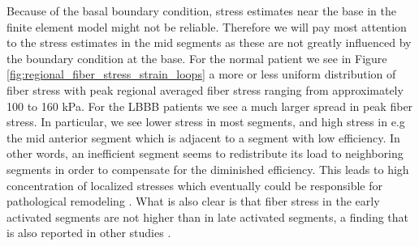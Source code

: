 Because of the basal boundary condition, stress estimates near the
base in the finite element model might not be reliable. Therefore we
will pay most attention to the stress 
estimates in the mid segments as these are not greatly influenced by
the boundary condition at the base. For the normal patient we see in
Figure \ref{fig:regional_fiber_stress_strain_loops} a
more or less uniform distribution of fiber stress with peak regional
averaged fiber
stress ranging from approximately 100 to 160 kPa. For the LBBB
patients we see a much larger spread in peak fiber stress. In
particular, we see lower stress in most segments, and high stress
in e.g the mid anterior segment which is adjacent to a segment with
low efficiency. In other words, an inefficient segment seems to
redistribute its load to neighboring segments in order to compensate
for the diminished efficiency. This leads to high concentration of
localized stresses which eventually could be responsible for pathological remodeling
\cite{grossman1975wall}. What is also clear is that fiber stress in the
early activated segments are not higher than in late activated
segments, a finding that is also reported in other studies
\cite{delhaas1994regional}. 






